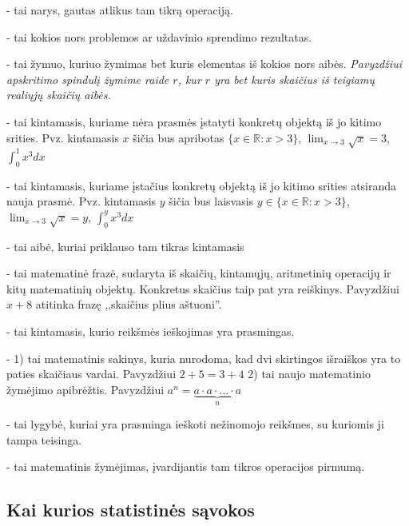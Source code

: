 \documentclass{article}
\begin{document}
 - tai narys, gautas atlikus tam tikrą operaciją. \par
{} - tai kokios nors problemos ar uždavinio sprendimo rezultatas.\par
{} - tai žymuo, kuriuo žymimas bet kuris elementas iš kokios nors aibės. \textit{Pavyzdžiui apskritimo spindulį žymime raide $r$, kur $r$ yra bet kuris skaičius iš teigiamų realiųjų skaičių aibės.} \par
{} - tai kintamasis, kuriame nėra prasmės įstatyti konkretų objektą iš jo kitimo srities. Pvz. kintamasis $x$ šičia bus apribotas $\{x\in \mathbb{R}: x>3\}$, $\displaystyle \lim_{x\to 3}\sqrt{x}=3$, $\displaystyle \int_{0}^{1}x^3dx$ \par
{} - tai kintamasis, kuriame įstačius konkretų objektą iš jo kitimo srities atsiranda nauja prasmė. Pvz. kintamasis $y$ šičia bus laisvasis $y\in\{x\in \mathbb{R}: x>3\}$, $\displaystyle \lim_{x\to 3}\sqrt{x}=y$, $\displaystyle \int_{0}^{y}x^3dx$ \par
{} - tai aibė, kuriai priklauso tam tikras kintamasis\par
{} - tai matematinė frazė, sudaryta iš skaičių, kintamųjų, aritmetinių operacijų ir kitų matematinių objektų. Konkretus skaičius taip pat yra reiškinys. Pavyzdžiui $x+8$ atitinka frazę ,,skaičius plius aštuoni''. \par
{} - tai kintamasis, kurio reikšmės ieškojimas yra prasmingas.\par
{} - 1) tai matematinis sakinys, kuria nurodoma, kad dvi skirtingos išraiškos yra to paties skaičiaus vardai. Pavyzdžiui $2+5 = 3+4$ 2) tai naujo matematinio žymėjimo apibrėžtis. Pavyzdžiui $a^n=\underbrace{a\cdot a\cdot\dots\cdot a}_n$\par
{} - tai lygybė, kuriai yra prasminga ieškoti nežinomojo reikšmes, su kuriomis ji tampa teisinga.\par
{} - tai matematinis žymėjimas, įvardijantis tam tikros operacijos pirmumą.

\subsection*{Kai kurios statistinės sąvokos}
\end{document}
